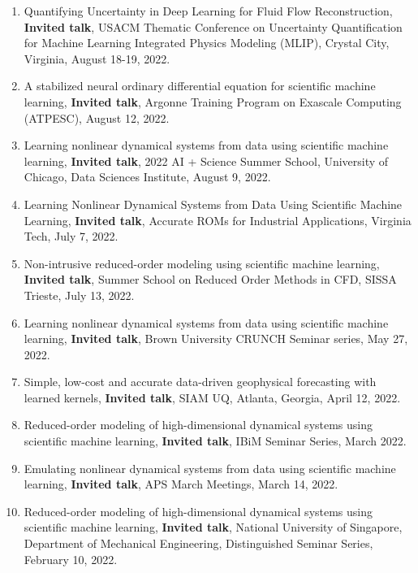 \documentclass[letterpaper]{article}
\begin{document}
\begin{enumerate}
\item Quantifying Uncertainty in Deep Learning for Fluid Flow Reconstruction, \textbf{Invited talk}, USACM Thematic Conference on Uncertainty Quantification for Machine Learning Integrated Physics Modeling (MLIP), Crystal City, Virginia, August 18-19, 2022.

\item A stabilized neural ordinary differential equation for scientific machine learning, \textbf{Invited talk}, Argonne Training Program on Exascale Computing (ATPESC), August 12, 2022.

\item Learning nonlinear dynamical systems from data using scientific machine learning, \textbf{Invited talk}, 2022 AI + Science Summer School, University of Chicago, Data Sciences Institute, August 9, 2022.

\item Learning Nonlinear Dynamical Systems from Data Using Scientific Machine Learning, \textbf{Invited talk}, Accurate ROMs for Industrial Applications, Virginia Tech, July 7, 2022.

\item Non-intrusive reduced-order modeling using scientific machine learning, \textbf{Invited talk}, Summer School on Reduced Order Methods in CFD, SISSA Trieste, July 13, 2022.

\item Learning nonlinear dynamical systems from data using scientific machine learning, \textbf{Invited talk}, Brown University CRUNCH Seminar series, May 27, 2022. 

\item Simple, low-cost and accurate data-driven geophysical forecasting with learned kernels, \textbf{Invited talk}, SIAM UQ, Atlanta, Georgia, April 12, 2022.

\item Reduced-order modeling of high-dimensional dynamical systems using scientific machine learning, \textbf{Invited talk}, IBiM Seminar Series, March 2022.

\item Emulating nonlinear dynamical systems from data using scientific machine learning, \textbf{Invited talk}, APS March Meetings, March 14, 2022.

\item Reduced-order modeling of high-dimensional dynamical systems using scientific machine learning, \textbf{Invited talk}, National University of Singapore, Department of Mechanical Engineering, Distinguished Seminar Series, February 10, 2022.


\end{enumerate}
\end{document}
